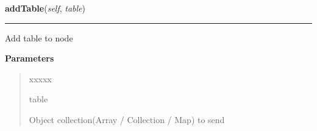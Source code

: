 \hspace{.8\funcindent}\begin{boxedminipage}{\funcwidth}

    \raggedright \textbf{addTable}(\textit{self}, \textit{table})

    \vspace{-1.5ex}

    \rule{\textwidth}{0.5\fboxrule}
\setlength{\parskip}{2ex}
    Add table to node

\setlength{\parskip}{1ex}
      \textbf{Parameters}
      \vspace{-1ex}

      \begin{quote}
        \begin{Ventry}{xxxxx}

          \item[table]

          Object collection(Array / Collection / Map) to send

        \end{Ventry}

      \end{quote}

    \end{boxedminipage}

    \label{tracetool:TraceNodeEx:addDump}

    \vspace{0.5ex}


